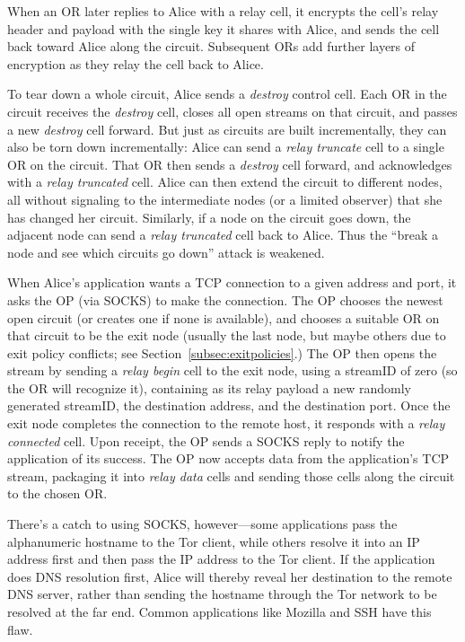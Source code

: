 \documentclass[times,10pt,twocolumn]{article}
\begin{document}
When an OR later replies to Alice with a relay cell, it
encrypts the cell's relay header and payload with the single key it
shares with Alice, and sends the cell back toward Alice along the
circuit.  Subsequent ORs add further layers of encryption as they
relay the cell back to Alice.

To tear down a whole circuit, Alice sends a \emph{destroy} control
cell. Each OR in the circuit receives the \emph{destroy} cell, closes
all open streams on that circuit, and passes a new \emph{destroy} cell
forward. But just as circuits are built incrementally, they can also
be torn down incrementally: Alice can send a \emph{relay
truncate} cell to a single OR on the circuit. That OR then sends a
\emph{destroy} cell forward, and acknowledges with a
\emph{relay truncated} cell. Alice can then extend the circuit to
different nodes, all without signaling to the intermediate nodes (or
a limited observer) that she has changed her circuit.
Similarly, if a node on the circuit goes down, the adjacent
node can send a \emph{relay truncated} cell back to Alice.  Thus the
``break a node and see which circuits go down'' attack
\cite{freedom21-security} is weakened.

\label{subsec:tcp}

When Alice's application wants a TCP connection to a given
address and port, it asks the OP (via SOCKS) to make the
connection. The OP chooses the newest open circuit (or creates one if
none is available), and chooses a suitable OR on that circuit to be the
exit node (usually the last node, but maybe others due to exit policy
conflicts; see Section~\ref{subsec:exitpolicies}.) The OP then opens
the stream by sending a \emph{relay begin} cell to the exit node,
using a streamID of zero (so the OR will recognize it), containing as
its relay payload a new randomly generated streamID, the destination
address, and the destination port.  Once the
exit node completes the connection to the remote host, it responds
with a \emph{relay connected} cell.  Upon receipt, the OP sends a
SOCKS reply to notify the application of its success. The OP
now accepts data from the application's TCP stream, packaging it into
\emph{relay data} cells and sending those cells along the circuit to
the chosen OR.

There's a catch to using SOCKS, however---some applications pass the
alphanumeric hostname to the Tor client, while others resolve it into
an IP address first and then pass the IP address to the Tor client. If
the application does DNS resolution first, Alice will thereby reveal her
destination to the remote DNS server, rather than sending the hostname
through the Tor network to be resolved at the far end. Common applications
like Mozilla and SSH have this flaw.
\end{document}
